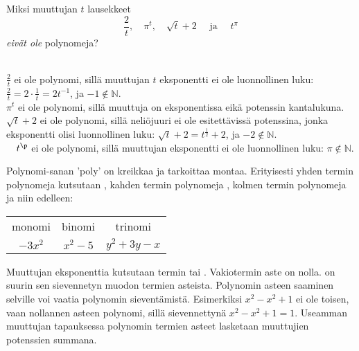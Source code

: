 \begin{esimerkki}

Miksi muuttujan $t$ lausekkeet 
\[ \frac{2}{t}, \quad \pi^t,  \quad \sqrt{t}+2 \quad \text{ ja } \quad t^\pi \]  \emph{eivät ole} polynomeja?

	\begin{esimratk}
 \\
$\frac{2}{t}$ ei ole polynomi, sillä muuttujan $t$ eksponentti ei ole luonnollinen luku: $\frac{2}{t}=2\cdot \frac{1}{t}= 2t^{-1}$, ja $-1\nin \mathbb{N}$. \\
$\pi^t$ ei ole polynomi, sillä muuttuja on eksponentissa eikä potenssin kantalukuna. \\
$\sqrt{t}+2$ ei ole polynomi, sillä neliöjuuri ei ole esitettävissä potenssina, jonka eksponentti olisi luonnollinen luku: $\sqrt{t}+2=t^{\frac{1}{2}}+2$, ja $-2 \nin \mathbb{N}$. \\
$\quad t^\p$ ei ole polynomi, sillä muuttujan eksponentti ei ole luonnollinen luku: $\pi \nin \mathbb{N}$. \\
	\end{esimratk}
\end{esimerkki}



Polynomi-sanan 'poly' on kreikkaa ja tarkoittaa montaa. Erityisesti yhden termin polynomeja kutsutaan , kahden termin polynomeja , kolmen termin polynomeja  ja niin edelleen:
\begin{center}\begin{tabular}{ccc}
monomi	& binomi 	&	trinomi \\
$-3x^2$   &	$x^2-5$	& $y^2+3y-x$
 \end{tabular} \end{center}

Muuttujan eksponenttia kutsutaan termin  tai . Vakiotermin aste on nolla.  on suurin sen sievennetyn muodon termien asteista. Polynomin asteen saaminen selville voi vaatia polynomin sieventämistä. Esimerkiksi $x^2-x^2+1$ ei ole toisen, vaan nollannen asteen polynomi, sillä sievennettynä $x^2-x^2+1=1$. Useamman muuttujan tapauksessa polynomin termien asteet lasketaan muuttujien potenssien summana.

